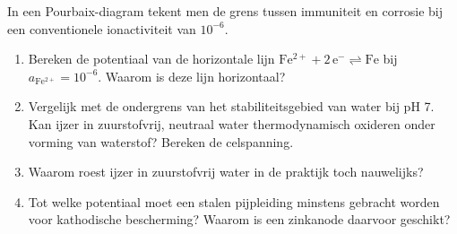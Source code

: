 \begin{oefening}
In een Pourbaix-diagram tekent men de grens tussen immuniteit en corrosie bij een conventionele ionactiviteit van \(10^{-6}\).

\begin{enumerate}
\item[(a)]
  Bereken de potentiaal van de horizontale lijn \(\mathrm{Fe^{2+} + 2\,e^- \rightleftharpoons Fe}\) bij \(a_{\mathrm{Fe^{2+}}} = 10^{-6}\). Waarom is deze lijn horizontaal?
\item[(b)]
  Vergelijk met de ondergrens van het stabiliteitsgebied van water bij pH 7. Kan ijzer in zuurstofvrij, neutraal water thermodynamisch oxideren onder vorming van waterstof? Bereken de celspanning.
\item[(c)]
  Waarom roest ijzer in zuurstofvrij water in de praktijk toch nauwelijks?
\item[(d)]
  Tot welke potentiaal moet een stalen pijpleiding minstens gebracht worden voor kathodische bescherming? Waarom is een zinkanode daarvoor geschikt?
\end{enumerate}
\end{oefening}
